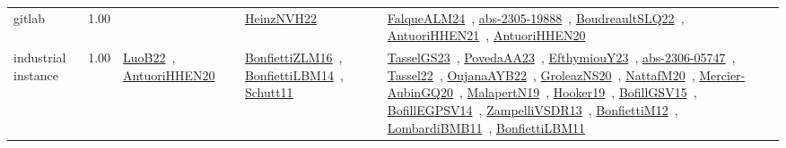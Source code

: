{\begin{longtable}{p{3cm}r>{\raggedright\arraybackslash}p{6cm}>{\raggedright\arraybackslash}p{6cm}>{\raggedright\arraybackslash}p{8cm}}
\index{gitlab}\index{Benchmarks!gitlab}gitlab &  1.00 &  & \href{../works/HeinzNVH22.pdf}{HeinzNVH22}~\cite{HeinzNVH22} & \href{../works/FalqueALM24.pdf}{FalqueALM24}~\cite{FalqueALM24}, \href{../works/abs-2305-19888.pdf}{abs-2305-19888}~\cite{abs-2305-19888}, \href{../works/BoudreaultSLQ22.pdf}{BoudreaultSLQ22}~\cite{BoudreaultSLQ22}, \href{../works/AntuoriHHEN21.pdf}{AntuoriHHEN21}~\cite{AntuoriHHEN21}, \href{../works/AntuoriHHEN20.pdf}{AntuoriHHEN20}~\cite{AntuoriHHEN20}\\
\index{industrial instance}\index{Benchmarks!industrial instance}industrial instance &  1.00 & \href{../works/LuoB22.pdf}{LuoB22}~\cite{LuoB22}, \href{../works/AntuoriHHEN20.pdf}{AntuoriHHEN20}~\cite{AntuoriHHEN20} & \href{../works/BonfiettiZLM16.pdf}{BonfiettiZLM16}~\cite{BonfiettiZLM16}, \href{../works/BonfiettiLBM14.pdf}{BonfiettiLBM14}~\cite{BonfiettiLBM14}, \href{../works/Schutt11.pdf}{Schutt11}~\cite{Schutt11} & \href{../works/TasselGS23.pdf}{TasselGS23}~\cite{TasselGS23}, \href{../works/PovedaAA23.pdf}{PovedaAA23}~\cite{PovedaAA23}, \href{../works/EfthymiouY23.pdf}{EfthymiouY23}~\cite{EfthymiouY23}, \href{../works/abs-2306-05747.pdf}{abs-2306-05747}~\cite{abs-2306-05747}, \href{../works/Tassel22.pdf}{Tassel22}~\cite{Tassel22}, \href{../works/OujanaAYB22.pdf}{OujanaAYB22}~\cite{OujanaAYB22}, \href{../works/GroleazNS20.pdf}{GroleazNS20}~\cite{GroleazNS20}, \href{../works/NattafM20.pdf}{NattafM20}~\cite{NattafM20}, \href{../works/Mercier-AubinGQ20.pdf}{Mercier-AubinGQ20}~\cite{Mercier-AubinGQ20}, \href{../works/MalapertN19.pdf}{MalapertN19}~\cite{MalapertN19}, \href{../works/Hooker19.pdf}{Hooker19}~\cite{Hooker19}, \href{../works/BofillGSV15.pdf}{BofillGSV15}~\cite{BofillGSV15}, \href{../works/BofillEGPSV14.pdf}{BofillEGPSV14}~\cite{BofillEGPSV14}, \href{../works/ZampelliVSDR13.pdf}{ZampelliVSDR13}~\cite{ZampelliVSDR13}, \href{../works/BonfiettiM12.pdf}{BonfiettiM12}~\cite{BonfiettiM12}, \href{../works/LombardiBMB11.pdf}{LombardiBMB11}~\cite{LombardiBMB11}, \href{../works/BonfiettiLBM11.pdf}{BonfiettiLBM11}~\cite{BonfiettiLBM11}\\

\end{longtable}}
